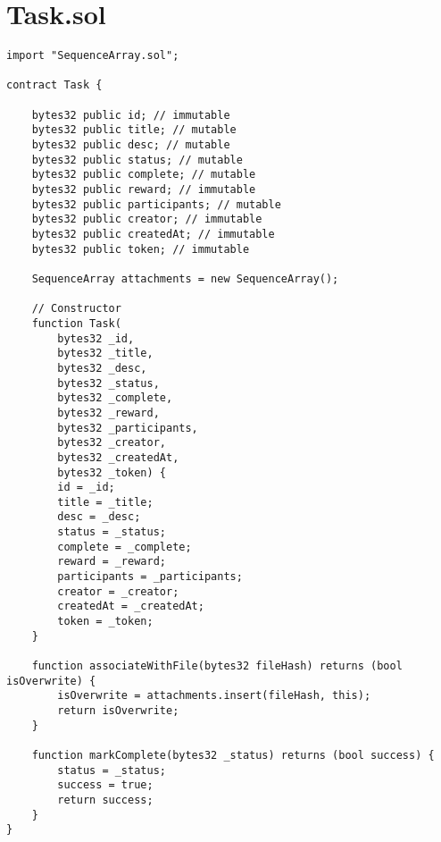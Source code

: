 \section{Task.sol}
\lstset{language=java}
\begin{lstlisting}
import "SequenceArray.sol";

contract Task {

    bytes32 public id; // immutable
    bytes32 public title; // mutable
    bytes32 public desc; // mutable
    bytes32 public status; // mutable
    bytes32 public complete; // mutable
    bytes32 public reward; // immutable
    bytes32 public participants; // mutable
    bytes32 public creator; // immutable
    bytes32 public createdAt; // immutable
    bytes32 public token; // immutable

    SequenceArray attachments = new SequenceArray();

    // Constructor
    function Task(
        bytes32 _id,
        bytes32 _title,
        bytes32 _desc,
        bytes32 _status,
        bytes32 _complete,
        bytes32 _reward,
        bytes32 _participants,
        bytes32 _creator,
        bytes32 _createdAt,
        bytes32 _token) {
        id = _id;
        title = _title;
        desc = _desc;
        status = _status;
        complete = _complete;
        reward = _reward;
        participants = _participants;
        creator = _creator;
        createdAt = _createdAt;
        token = _token;
    }

    function associateWithFile(bytes32 fileHash) returns (bool isOverwrite) {
        isOverwrite = attachments.insert(fileHash, this);
        return isOverwrite;
    }

    function markComplete(bytes32 _status) returns (bool success) {
        status = _status;
        success = true;
        return success;
    }
}
\end{lstlisting}


